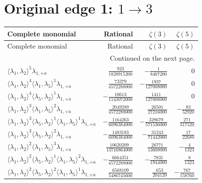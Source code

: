 \section{Original edge 1: $1\to 3$}
\begin{longtable}{@{}lrrr@{}}
\toprule
Complete monomial & Rational & $\zeta(3)$ & $\zeta(5)$ \\
\midrule\endfirsthead
\toprule Complete monomial & Rational & $\zeta(3)$ & $\zeta(5)$ \\
\midrule\endhead
\midrule\multicolumn{4}{r}{Continued on the next page.}\\\endfoot
\bottomrule\endlastfoot
$\langle\lambda_1,\lambda_2\rangle^{5}\lambda_{1,+\dot a}$ & $\frac{923}{1828915200}$ & $-\frac{1}{8467200}$ & $0$ \\
$\langle\lambda_1,\lambda_2\rangle^{4}\langle\lambda_1,\lambda_5\rangle^{1}\lambda_{1,+\dot a}$ & $\frac{73379}{4572288000}$ & $-\frac{1937}{127008000}$ & $0$ \\
$\langle\lambda_1,\lambda_2\rangle^{4}\langle\lambda_5,\lambda_2\rangle^{1}\lambda_{1,+\dot a}$ & $-\frac{10613}{1143072000}$ & $\frac{1411}{127008000}$ & $0$ \\
$\langle\lambda_1,\lambda_2\rangle^{3}\langle\lambda_1,\lambda_5\rangle^{2}\lambda_{1,+\dot a}$ & $\frac{2049289}{4572288000}$ & $\frac{26501}{27216000}$ & $-\frac{83}{52920}$ \\
$\langle\lambda_1,\lambda_2\rangle^{3}\langle\lambda_5,\lambda_2\rangle^{1}\langle\lambda_1,\lambda_5\rangle^{1}\lambda_{1,+\dot a}$ & $-\frac{1164263}{6096384000}$ & $-\frac{328679}{571536000}$ & $\frac{271}{317520}$ \\
$\langle\lambda_1,\lambda_2\rangle^{3}\langle\lambda_5,\lambda_2\rangle^{2}\lambda_{1,+\dot a}$ & $-\frac{1483183}{6096384000}$ & $-\frac{31243}{71442000}$ & $\frac{17}{22680}$ \\
$\langle\lambda_1,\lambda_2\rangle^{2}\langle\lambda_1,\lambda_5\rangle^{3}\lambda_{1,+\dot a}$ & $\frac{10620209}{13716864000}$ & $\frac{26771}{13608000}$ & $-\frac{4}{1323}$ \\
$\langle\lambda_1,\lambda_2\rangle^{2}\langle\lambda_5,\lambda_2\rangle^{1}\langle\lambda_1,\lambda_5\rangle^{2}\lambda_{1,+\dot a}$ & $-\frac{6664351}{4572288000}$ & $-\frac{7831}{1944000}$ & $\frac{8}{1323}$ \\
$\langle\lambda_1,\lambda_2\rangle^{2}\langle\lambda_5,\lambda_2\rangle^{2}\langle\lambda_1,\lambda_5\rangle^{1}\lambda_{1,+\dot a}$ & $\frac{6568109}{5486745600}$ & $\frac{653}{204120}$ & $-\frac{767}{158760}$ \\

\end{longtable}
